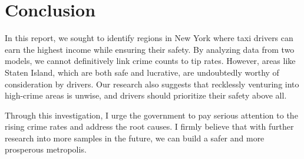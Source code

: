 \documentclass[11pt]{article}
\begin{document}
\section{Conclusion}
In this report, we sought to identify regions in New York where taxi drivers can earn the highest income while ensuring their safety. By analyzing data from two models, we cannot definitively link crime counts to tip rates. However, areas like Staten Island, which are both safe and lucrative, are undoubtedly worthy of consideration by drivers. Our research also suggests that recklessly venturing into high-crime areas is unwise, and drivers should prioritize their safety above all.

Through this investigation, I urge the government to pay serious attention to the rising crime rates and address the root causes. I firmly believe that with further research into more samples in the future, we can build a safer and more prosperous metropolis.
\clearpage


\printbibliography
\end{document}

